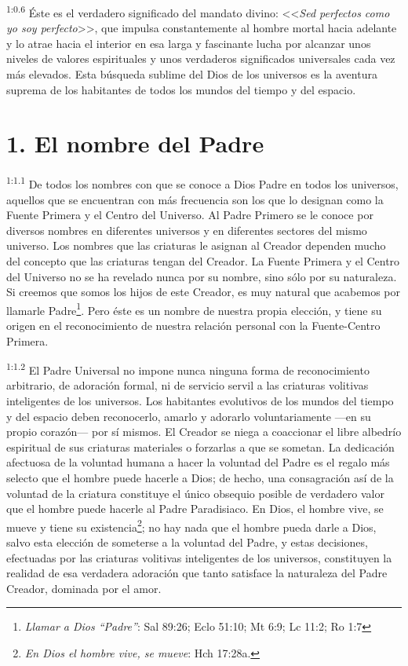 \par
\textsuperscript{1:0.6} Éste es el verdadero significado del mandato divino: <<\textit{Sed perfectos como yo soy perfecto}>>, que impulsa constantemente al hombre mortal hacia adelante y lo atrae hacia el interior en esa larga y fascinante lucha por alcanzar unos niveles de valores espirituales y unos verdaderos significados universales cada vez más elevados. Esta búsqueda sublime del Dios de los universos es la aventura suprema de los habitantes de todos los mundos del tiempo y del espacio.

\section*{1. El nombre del Padre}
\par
\textsuperscript{1:1.1} De todos los nombres con que se conoce a Dios Padre en todos los universos, aquellos que se encuentran con más frecuencia son los que lo designan como la Fuente Primera y el Centro del Universo. Al Padre Primero se le conoce por diversos nombres en diferentes universos y en diferentes sectores del mismo universo. Los nombres que las criaturas le asignan al Creador dependen mucho del concepto que las criaturas tengan del Creador. La Fuente Primera y el Centro del Universo no se ha revelado nunca por su nombre, sino sólo por su naturaleza. Si creemos que somos los hijos de este Creador, es muy natural que acabemos por llamarle Padre\footnote{\textit{Llamar a Dios ``Padre''}: Sal 89:26; Eclo 51:10; Mt 6:9; Lc 11:2; Ro 1:7}. Pero éste es un nombre de nuestra propia elección, y tiene su origen en el reconocimiento de nuestra relación personal con la Fuente-Centro Primera.

\par
\textsuperscript{1:1.2} El Padre Universal no impone nunca ninguna forma de reconocimiento arbitrario, de adoración formal, ni de servicio servil a las criaturas volitivas inteligentes de los universos. Los habitantes evolutivos de los mundos del tiempo y del espacio deben reconocerlo, amarlo y adorarlo voluntariamente ---en su propio corazón--- por sí mismos. El Creador se niega a coaccionar el libre albedrío espiritual de sus criaturas materiales o forzarlas a que se sometan. La dedicación afectuosa de la voluntad humana a hacer la voluntad del Padre es el regalo más selecto que el hombre puede hacerle a Dios; de hecho, una consagración así de la voluntad de la criatura constituye el único obsequio posible de verdadero valor que el hombre puede hacerle al Padre Paradisiaco. En Dios, el hombre vive, se mueve y tiene su existencia\footnote{\textit{En Dios el hombre vive, se mueve}: Hch 17:28a.}; no hay nada que el hombre pueda darle a Dios, salvo esta elección de someterse a la voluntad del Padre, y estas decisiones, efectuadas por las criaturas volitivas inteligentes de los universos, constituyen la realidad de esa verdadera adoración que tanto satisface la naturaleza del Padre Creador, dominada por el amor.

